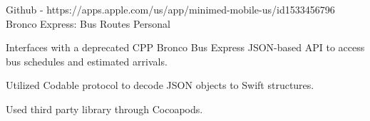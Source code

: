 \begin{cventries}
  \cventry
    {Github - https://apps.apple.com/us/app/minimed-mobile-us/id1533456796} %
    {Bronco Express: Bus Routes} %
    {Personal} %
    {} %
    {
      \begin{cvitems} %
        \item {Interfaces with a deprecated CPP Bronco Bus Express JSON-based API to access bus schedules and estimated arrivals.}
        \item {Utilized Codable protocol to decode JSON objects to Swift structures.}
        \item {Used third party library through Cocoapods.}
      \end{cvitems}
    }

\end{cventries}
